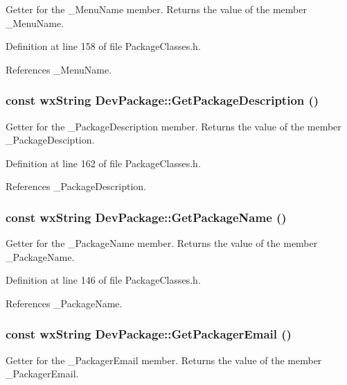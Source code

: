 Getter for the \_\-Menu\-Name member. Returns the value of the member \_\-Menu\-Name. 

Definition at line 158 of file Package\-Classes.h.

References \_\-Menu\-Name.
\subsubsection{\setlength{\rightskip}{0pt plus 5cm}const wx\-String Dev\-Package::Get\-Package\-Description ()\hspace{0.3cm}{\tt  [inline]}}\label{class_dev_package_65c6e0b5444d69590ade6f43c25d7cfa}


Getter for the \_\-Package\-Description member. Returns the value of the member \_\-Package\-Desciption. 

Definition at line 162 of file Package\-Classes.h.

References \_\-Package\-Description.
\subsubsection{\setlength{\rightskip}{0pt plus 5cm}const wx\-String Dev\-Package::Get\-Package\-Name ()\hspace{0.3cm}{\tt  [inline]}}\label{class_dev_package_988efaf610d6c822e95f66ed1a5de498}


Getter for the \_\-Package\-Name member. Returns the value of the member \_\-Package\-Name. 

Definition at line 146 of file Package\-Classes.h.

References \_\-Package\-Name.
\subsubsection{\setlength{\rightskip}{0pt plus 5cm}const wx\-String Dev\-Package::Get\-Packager\-Email ()\hspace{0.3cm}{\tt  [inline]}}\label{class_dev_package_51e5647e5b18ba83e5f9dd9ee20a1139}


Getter for the \_\-Packager\-Email member. Returns the value of the member \_\-Packager\-Email. 

